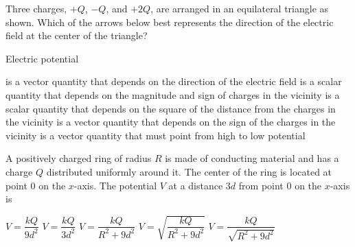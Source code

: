 \documentclass{../../oss-apphys-exam}
\begin{document}
\begin{multicols*}{2}
\begin{questions}
    \question Three charges, $+Q$, $-Q$, and $+2Q$, are arranged in an
    equilateral triangle as shown. Which of the arrows below best represents the
    direction of the electric field at the center of the triangle?
    \begin{center}
      \vspace{-.1in}
    \end{center}
    \begin{choices}
      \choice {\Huge$\downarrow$}
      \choice {\Huge$\uparrow$}
      \choice {\Huge$\searrow$}
      \choice {\Huge$\swarrow$}
      \choice {\Huge$\nearrow$}
    \end{choices}
    
    \question Electric potential
    \begin{choices}
      \choice is a vector quantity that depends on the direction of the electric
      field
      \choice is a scalar quantity that depends on the magnitude and sign of
      charges in the vicinity
      \choice is a scalar quantity that depends on the square of the distance
      from the charges in the vicinity
      \choice is a vector quantity that depends on the sign of the charges in
      the vicinity
      \choice is a vector quantity that must point from high to low potential
    \end{choices}
   
    \question A positively charged ring of radius $R$ is made of conducting
    material and has a charge $Q$ distributed uniformly around it. The center of
    the ring is located at point $0$ on the $x$-axis. The potential $V$ at a
    distance $3d$ from point $0$ on the $x$-axis is
    \begin{center}
    \end{center}
    \begin{choices}
      \choice $V=\dfrac{kQ}{9d^2}$
      \choice $V=\dfrac{kQ}{3d^2}$
      \choice $V=\dfrac{kQ}{R^2+9d^2}$
      \choice $V=\sqrt{\dfrac{kQ}{R^2+9d^2}}$
      \choice $V=\dfrac{kQ}{\sqrt{R^2+9d^2}}$
    \end{choices}
    \columnbreak
  

\end{questions}
\end{multicols*}
\end{document}
